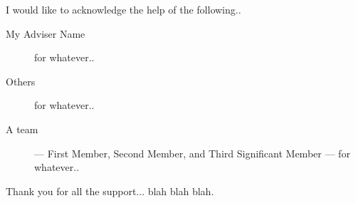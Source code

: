 I would like to acknowledge the help of the following..
\begin{description}
    \item[My Adviser Name] for whatever..
    \item[Others] for whatever..
    \item[A team] --- First Member, Second Member, and Third Significant Member --- for whatever..
\end{description}
Thank you for all the support... blah blah blah.
